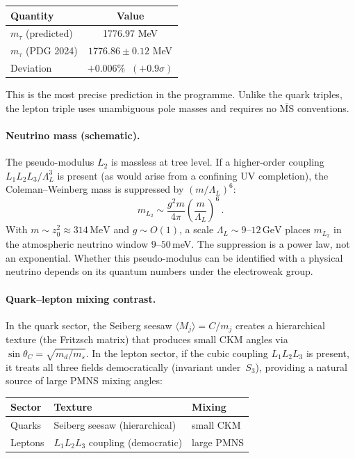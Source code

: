 \documentclass[12pt,a4paper]{article}
\newcommand{\MeV}{\,\text{MeV}}
\newcommand{\GeV}{\,\text{GeV}}
\begin{document}
\begin{center}
\begin{tabular}{lc}
\toprule
Quantity & Value \\
\midrule
$m_\tau$ (predicted) & 1776.97 MeV \\
$m_\tau$ (PDG 2024) & $1776.86 \pm 0.12$ MeV \\
Deviation & $+0.006\%\;\;(+0.9\sigma)$ \\
\bottomrule
\end{tabular}
\end{center}

This is the most precise prediction in the programme. Unlike the quark
triples, the lepton triple uses unambiguous pole masses and requires no
$\overline{\mathrm{MS}}$ conventions.

\paragraph{Neutrino mass (schematic).}
The pseudo-modulus $L_2$ is massless at tree level. If a higher-order
coupling $L_1 L_2 L_3/\Lambda_L^3$ is present (as would arise from
a confining UV completion), the Coleman--Weinberg mass is
suppressed by $(m/\Lambda_L)^6$:
$$
  m_{L_2} \sim \frac{g^2 m}{4\pi}
    \left(\frac{m}{\Lambda_L}\right)^{\!6}\,.
$$
With $m \sim z_0^2 \approx 314\MeV$ and
$g \sim O(1)$, a scale $\Lambda_L \sim 9$--$12\GeV$
places $m_{L_2}$ in the atmospheric neutrino window $9$--$50$\,meV.
The suppression is a power law, not an exponential.
Whether this pseudo-modulus can be identified with a
physical neutrino depends on its quantum numbers under the
electroweak group.

\paragraph{Quark--lepton mixing contrast.}
In the quark sector, the Seiberg
seesaw $\langle M_j\rangle = C/m_j$ creates a hierarchical
texture (the Fritzsch matrix) that produces small CKM angles
via $\sin\theta_C = \sqrt{m_d/m_s}$.  In the lepton sector,
if the cubic coupling $L_1 L_2 L_3$ is present, it treats
all three fields democratically (invariant under~$S_3$),
providing a natural source of large PMNS mixing angles:
\begin{center}
\begin{tabular}{lll}
\toprule
Sector & Texture & Mixing \\
\midrule
Quarks & Seiberg seesaw (hierarchical) & small CKM \\
Leptons & $L_1 L_2 L_3$ coupling (democratic) & large PMNS \\
\bottomrule
\end{tabular}
\end{center}
\end{document}
